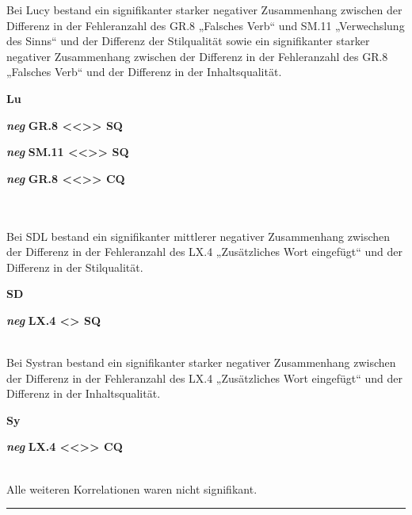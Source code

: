\medskip
\noindent
\parbox[t]{.7\textwidth}{
Bei Lucy bestand ein signifikanter starker negativer Zusammenhang zwischen der Differenz in der Fehleranzahl des GR.8 „Falsches Verb“ und SM.11 „Verwechslung des Sinns“ und der Differenz der Stilqualität sowie ein signifikanter starker negativer Zusammenhang zwischen der Differenz in der Fehleranzahl des GR.8 „Falsches Verb“ und der Differenz in der Inhaltsqualität.
}
\parbox[t]{.04\textwidth}{}
\colorbox{smGreen}{\parbox[t]{.25\textwidth}{
{ \textbf{Lu}}

{ \textbf{\textit{neg}} \textbf{GR.8 <{}<{}>{}> SQ}}

{ \textbf{\textit{neg}} \textbf{SM.11 <{}<{}>{}> SQ}}

\textbf{\textit{neg}} \textbf{GR.8 <{}<{}>{}> CQ}\\
\\
\\
}}

\medskip
\noindent
\parbox[t]{.7\textwidth}{
Bei SDL bestand ein signifikanter mittlerer negativer Zusammenhang zwischen der Differenz in der Fehleranzahl des LX.4 „Zusätzliches Wort eingefügt“ und der Differenz in der Stilqualität.
}
\parbox[t]{.04\textwidth}{}
\colorbox{smGreen}{\parbox[t]{.25\textwidth}{
{ \textbf{SD}}

\textbf{\textit{neg}} \textbf{LX.4 <> SQ}\\
\\
}}

\medskip
\noindent
\parbox[t]{.7\textwidth}{
Bei Systran bestand ein signifikanter starker negativer Zusammenhang zwischen der Differenz in der Fehleranzahl des LX.4 „Zusätzliches Wort eingefügt“ und der Differenz in der Inhaltsqualität.
}
\parbox[t]{.04\textwidth}{}
\colorbox{smGreen}{\parbox[t]{.25\textwidth}{
{ \textbf{Sy}}

\textbf{\textit{neg}} \textbf{LX.4 <{}<{}>{}> CQ}\\
\\
}}

\medskip
\noindent
\parbox[t]{.7\textwidth}{
Alle weiteren Korrelationen waren nicht signifikant.
}
\parbox[t]{.04\textwidth}{}
\parbox[t]{.25\textwidth}{}
\smallskip
\hrule
